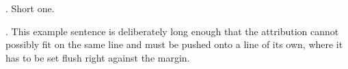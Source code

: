 

\ex. Short one. 

\ex. This example sentence is deliberately long enough that the attribution
cannot possibly fit on the same line and must be pushed onto a line of its
own, where it has to be set flush right against the margin.

